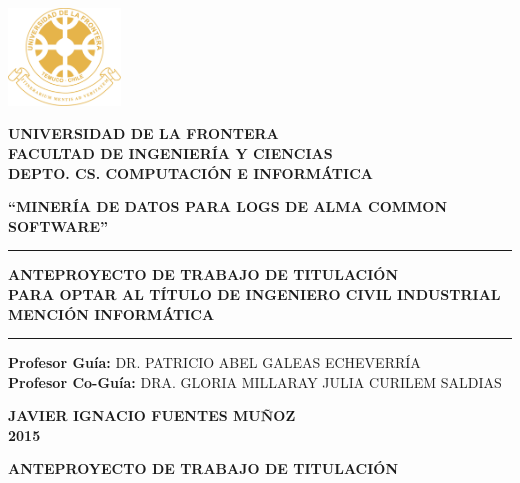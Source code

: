 \documentclass[12pt]{article}
\begin{document}
\begin{titlepage}


 \vfill
 \begin{minipage}{2.0cm}
     \includegraphics*[width=3.0cm]{img/logo}
 \end{minipage}
 \hfill
 \begin{minipage}{12cm}
 
 \centering
	\textbf{UNIVERSIDAD DE LA FRONTERA}\\
	\textbf{FACULTAD DE INGENIERÍA Y CIENCIAS}\\
	\textbf{DEPTO. CS. COMPUTACIÓN E INFORMÁTICA}
	
 
 \end{minipage}
 
 

	
	\vfill
	
	\textbf{“MINERÍA DE DATOS PARA LOGS DE ALMA COMMON SOFTWARE”}
	\vfill
	
	
	


    \begin{flushright}
	\rule{\linewidth}{.4eX}
	\textbf{
	ANTEPROYECTO DE TRABAJO DE TITULACIÓN\\
	PARA OPTAR AL TÍTULO DE INGENIERO CIVIL INDUSTRIAL MENCIÓN INFORMÁTICA}
	\rule{\linewidth}{.4ex}
	
	\vspace{2cm}
	
	\textbf{Profesor Guía:} DR. PATRICIO ABEL GALEAS ECHEVERRÍA\\
	\textbf{Profesor Co-Guía:} DRA. GLORIA MILLARAY JULIA CURILEM SALDIAS
	
	\end{flushright}
	
	\vspace{1cm}
	\begin{center}
	    \textbf{
	        JAVIER IGNACIO FUENTES MUÑOZ\\
	        2015
	    }
    \end{center}
	
\end{titlepage}

\newpage

\begin{center}
\textbf{ANTEPROYECTO DE TRABAJO DE TITULACIÓN}
\end{center}
\end{document}
